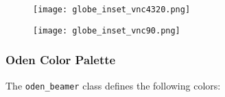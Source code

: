 \documentclass[10pt, aspectratio=169]{oden_beamer}
\begin{document}
\begin{frame}
    \begin{figure}
        \centering
        \begin{minipage}{.5\textwidth}
          \centering
          \texttt{[image: globe\_inset\_vnc4320.png]}
          \label{fig:test1}
        \end{minipage}%
        \begin{minipage}{.5\textwidth}
          \centering
          \texttt{[image: globe\_inset\_vnc90.png]}
          \label{fig:test2}
        \end{minipage}
        \end{figure}
\end{frame}



\begin{frame}
\frametitle{Oden Color Palette}
The \texttt{oden\_beamer} class defines the following colors:


\end{frame}
\end{document}

